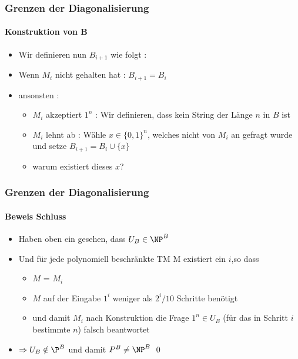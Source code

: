 \begin{frame}
	\frametitle{Grenzen der Diagonalisierung}
	\framesubtitle{Konstruktion von B}
	\begin{itemize}[<+->]
	  \item Wir definieren nun $B_{i+1}$ wie folgt :
	  \item Wenn $M_i$ nicht gehalten hat : $B_{i+1} = B_i$
	  \item ansonsten : \begin{itemize}
	    \item $M_i$ akzeptiert $1^n$ : Wir definieren, dass kein String der Länge $n$
	    in $B$ ist
	    \item $M_i$ lehnt ab : Wähle $x \in {\lbrace 0,1 \rbrace}^n$, welches nicht
	    von $M_i$ an gefragt wurde und setze $B_{i+1} = B_i \cup \lbrace x \rbrace$
	    \item warum existiert dieses $x$?
	    \end{itemize}
	\end{itemize}
\end{frame}

\begin{frame}
	\frametitle{Grenzen der Diagonalisierung}
	\framesubtitle{Beweis Schluss}
	
	\begin{itemize}[<+->]
	  \item Haben oben ein gesehen, dass $U_B \in {\NP}^B$
	  \item Und f\"ur jede polynomiell beschränkte TM M existiert ein $i$,so dass 
	  	\begin{itemize}
	  	  \item $M$ = $M_i$
	  	  \item $M$ auf der Eingabe $1^i$ weniger als $2^i / 10 $ Schritte benötigt
	  	  \item und damit $M_i$ nach Konstruktion die Frage $1^n \in U_B$ (f\"ur
	  	  das in Schritt $i$ bestimmte $n$) falsch beantwortet
	  	 \end{itemize}
	  	\item $\Rightarrow U_B \notin {\P}^B$ und damit ${P}^B \neq {\NP}^B$ \qed
	\end{itemize}
\end{frame}